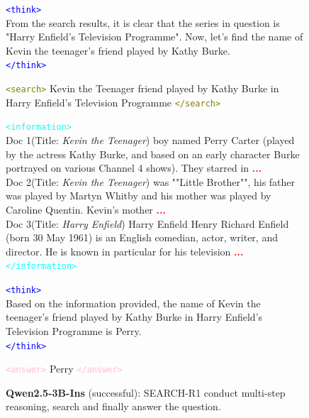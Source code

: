 \begin{figure}[h]
\begin{tcolorbox}[colback=white,colframe=black!60,title=\textbf{Question:} What is the name of Kevin the teenager's friend played by Kathy Burke in a series of sketches with Harry Enfield?]
\vspace{0.5em}
\textcolor{blue}{\texttt{<think>}}\\
From the search results, it is clear that the series in question is "Harry Enfield's Television Programme". Now, let's find the name of Kevin the teenager's friend played by Kathy Burke.\\
\textcolor{blue}{\texttt{</think>}}

\vspace{0.5em}
\textcolor{olive}{\texttt{<search>}} Kevin the Teenager friend played by Kathy Burke in Harry Enfield's Television Programme \textcolor{olive}{\texttt{</search>}}

\vspace{0.5em}
\textcolor{cyan}{\texttt{<information>}}\\
Doc 1(Title: \textit{Kevin the Teenager}) boy named Perry Carter (played by the actress Kathy Burke, and based on an early character Burke portrayed on various Channel 4 shows). They starred in \textcolor{red}{\textbf{...}}\\
Doc 2(Title: \textit{Kevin the Teenager}) was ""Little Brother"", his father was played by Martyn Whitby and his mother was played by Caroline Quentin. Kevin's mother  \textcolor{red}{\textbf{...}}\\
Doc 3(Title: \textit{Harry Enfield}) Harry Enfield Henry Richard Enfield (born 30 May 1961) is an English comedian, actor, writer, and director. He is known in particular for his television \textcolor{red}{\textbf{...}}\\
\textcolor{cyan}{\texttt{</information>}}

\vspace{0.5em}
\textcolor{blue}{\texttt{<think>}}\\
Based on the information provided, the name of Kevin the teenager's friend played by Kathy Burke in Harry Enfield's Television Programme is Perry. \\
\textcolor{blue}{\texttt{</think>}}
\vspace{0.5em}

\textcolor{pink}{\texttt{<answer>}} Perry \textcolor{pink}{\texttt{</answer>}}
\end{tcolorbox}
\caption{ \textbf{Qwen2.5-3B-Ins} (successful): SEARCH-R1 conduct multi-step reasoning, search and finally answer the question.}
\label{fig:reasoning-trace-3bins}
\end{figure}


